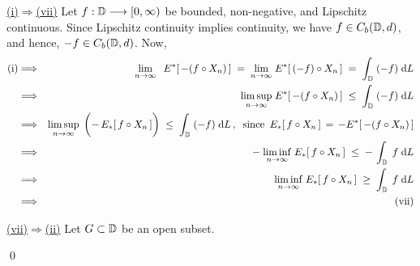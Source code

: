 \vskip 0.3cm \noindent
\underline{(i)\;$\Longrightarrow$\;(vii)}
\vskip 0.2cm \noindent
Let $f : \mathbb{D} \longrightarrow [0,\infty)$ be bounded, non-negative, and Lipschitz continuous.
Since Lipschitz continuity implies continuity, we have $f \in C_{b}(\mathbb{D},d)$, and hence, $-f \in C_{b}(\mathbb{D},d)$.
Now,
\begin{eqnarray*}
\textnormal{(i)}
&\Longrightarrow&
	{\color{white}1}\underset{n\rightarrow\infty}{\lim}\;\;\,E^{*}\!\left[\,-(f \circ X_{n})\,\right]
	\;=\; \underset{n\rightarrow\infty}{\lim}\;E^{*}\!\left[\,(-f) \circ X_{n}\,\right]
	\;=\; \int_{\D}\;(-f)\;\d L
\\
&\Longrightarrow&
	\underset{n\rightarrow\infty}{\limsup}\;E^{*}\!\left[\,-(f \circ X_{n})\,\right] \;\leq\; \int_{\D}\;(-f)\;\d L
\\
&\Longrightarrow&
	\underset{n\rightarrow\infty}{\limsup}\;
	\left(\overset{{\color{white}\vert}}{-}\,E_{*}\!\left[\,f \circ X_{n}\,\right]\right) \;\leq\; \int_{\D}\;(-f)\;\d L\,,
	\;\;\textnormal{since \,$E_{*}[\,f \circ X_{n}\,] \,=\, -E^{*}[\,-(f \circ X_{n})\,]$}
\\
&\Longrightarrow&
	-\;\underset{n\rightarrow\infty}{\liminf}\;E_{*}\!\left[\,f \circ X_{n}\,\right]
	\;\leq\; -\,\int_{\D}\;f\;\d L
\\
&\Longrightarrow&
	\underset{n\rightarrow\infty}{\liminf}\;E_{*}\!\left[\,f \circ X_{n}\,\right]
	\;\geq\; \int_{\D}\;f\;\d L
\\
&\Longrightarrow&
	\textnormal{(vii)}
\end{eqnarray*}

\vskip 0.5cm \noindent
\underline{(vii)\;$\Longrightarrow$\;(ii)}
\vskip 0.2cm \noindent
Let $G \subset \mathbb{D}$ be an open subset.


\qed



\renewcommand{\theenumi}{\roman{enumi}}
\renewcommand{\labelenumi}{\textnormal{(\theenumi)}$\;\;$}

